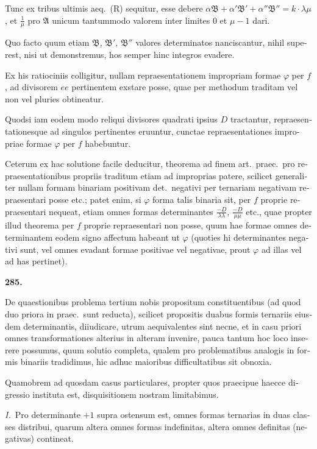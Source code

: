 \documentclass[12pt,a4paper]{article}
\theoremstyle{plain}
\theoremstyle{definition}
\theoremstyle{remark}
\begin{document}
\begin{otherlanguage}{latin}
Tunc ex tribus ultimis aeq.\ (R) sequitur, esse debere $\alpha\mathfrak{B} + \alpha'\mathfrak{B}' + \alpha''\mathfrak{B}'' = k \cdot \lambda\mu$, et $\frac{1}{\mu}$ pro $\mathfrak{A}$ unicum tantummodo valorem inter limites $0$ et $\mu - 1$ dari.

Quo facto quum etiam $\mathfrak{B}$, $\mathfrak{B}'$, $\mathfrak{B}''$ valores determinatos nanciscantur, nihil superest, nisi ut demonstremus, hos semper hinc integros evadere.

Ex his ratiociniis colligitur, nullam repraesentationem impropriam formae $\varphi$ per $f$, ad divisorem $ee$ pertinentem exstare posse, quae per methodum traditam vel non vel pluries obtineatur.

Quodsi iam eodem modo reliqui divisores quadrati ipsius $D$ tractantur, repraesentationesque ad singulos pertinentes eruuntur, cunctae repraesentationes impropriae formae $\varphi$ per $f$ habebuntur.

Ceterum ex hac solutione facile deducitur, theorema ad finem art.\ praec.\ pro repraesentationibus propriis traditum etiam ad improprias patere, scilicet generaliter nullam formam binariam positivam det.\ negativi per ternariam negativam repraesentari posse etc.; patet enim, si $\varphi$ forma talis binaria sit, per $f$ proprie repraesentari nequeat, etiam omnes formas determinantes $\frac{-D}{\lambda\lambda}$, $\frac{-D}{\mu\mu}$ etc., quae propter illud theorema per $f$ proprie repraesentari non posse, quum hae formae omnes determinantem eodem signo affectum habeant ut $\varphi$ (quoties hi determinantes negativi sunt, vel omnes evadant formae positivae vel negativae, prout $\varphi$ ad illas vel ad has pertinet).

\bigskip

\textbf{285.}

De quaestionibus problema tertium nobis propositum constituentibus (ad quod duo priora in praec.\ sunt reducta), scilicet propositis duabus formis ternariis eiusdem determinantis, diiudicare, utrum aequivalentes sint necne, et in casu priori omnes transformationes alterius in alteram invenire, pauca tantum hoc loco inserere possumus, quum solutio completa, qualem pro problematibus analogis in formis binariis tradidimus, hic adhuc maioribus difficultatibus sit obnoxia.

Quamobrem ad quosdam casus particulares, propter quos praecipue haecce digressio instituta est, disquisitionem nostram limitabimus.

\textit{I.}\ Pro determinante $+1$ supra ostensum est, omnes formas ternarias in duas classes distribui, quarum altera omnes formas indefinitas, altera omnes definitas (negativas) contineat.


\end{otherlanguage}
\end{document}
